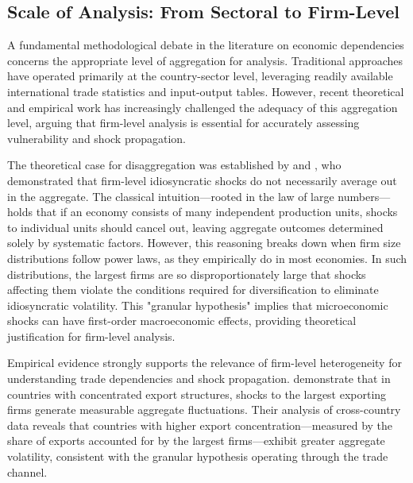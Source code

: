 \documentclass[final,1p,times,authoryear]{elsarticle}
\begin{document}
\subsection{Scale of Analysis: From Sectoral to Firm-Level}

A fundamental methodological debate in the literature on economic dependencies concerns the appropriate level of aggregation for analysis. Traditional approaches have operated primarily at the country-sector level, leveraging readily available international trade statistics and input-output tables. However, recent theoretical and empirical work has increasingly challenged the adequacy of this aggregation level, arguing that firm-level analysis is essential for accurately assessing vulnerability and shock propagation.

The theoretical case for disaggregation was established by \cite{Gabaix2011} and \cite{Acemoglu2012}, who demonstrated that firm-level idiosyncratic shocks do not necessarily average out in the aggregate. The classical intuition—rooted in the law of large numbers—holds that if an economy consists of many independent production units, shocks to individual units should cancel out, leaving aggregate outcomes determined solely by systematic factors. However, this reasoning breaks down when firm size distributions follow power laws, as they empirically do in most economies. In such distributions, the largest firms are so disproportionately large that shocks affecting them violate the conditions required for diversification to eliminate idiosyncratic volatility. This "granular hypothesis" implies that microeconomic shocks can have first-order macroeconomic effects, providing theoretical justification for firm-level analysis.

Empirical evidence strongly supports the relevance of firm-level heterogeneity for understanding trade dependencies and shock propagation. \cite{diGiovanni2012} demonstrate that in countries with concentrated export structures, shocks to the largest exporting firms generate measurable aggregate fluctuations. Their analysis of cross-country data reveals that countries with higher export concentration—measured by the share of exports accounted for by the largest firms—exhibit greater aggregate volatility, consistent with the granular hypothesis operating through the trade channel.
\end{document}
